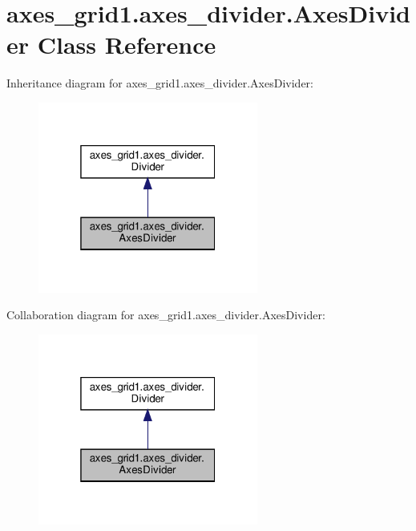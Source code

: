 \hypertarget{classaxes__grid1_1_1axes__divider_1_1AxesDivider}{}\section{axes\+\_\+grid1.\+axes\+\_\+divider.\+Axes\+Divider Class Reference}
\label{classaxes__grid1_1_1axes__divider_1_1AxesDivider}


Inheritance diagram for axes\+\_\+grid1.\+axes\+\_\+divider.\+Axes\+Divider\+:
\nopagebreak
\begin{figure}[H]
\begin{center}
\leavevmode
\includegraphics[width=205pt]{classaxes__grid1_1_1axes__divider_1_1AxesDivider__inherit__graph}
\end{center}
\end{figure}


Collaboration diagram for axes\+\_\+grid1.\+axes\+\_\+divider.\+Axes\+Divider\+:
\nopagebreak
\begin{figure}[H]
\begin{center}
\leavevmode
\includegraphics[width=205pt]{classaxes__grid1_1_1axes__divider_1_1AxesDivider__coll__graph}
\end{center}
\end{figure}
